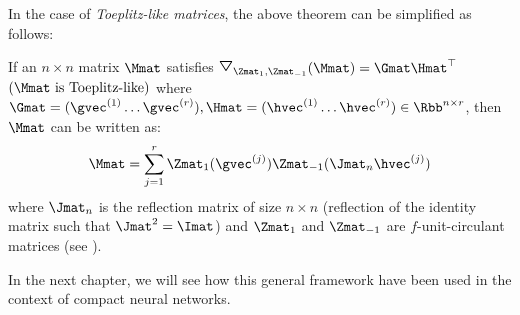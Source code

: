 \noindent
In the case of \emph{Toeplitz-like matrices}, the above theorem can be simplified as follows:
\begin{theorem} \label{theorem:ch2-toeplitz_like}
  If an $n \times n$ matrix $\Mmat$ satisfies $\triangleopdown_{\Zmat_1, \Zmat_{-1}}(\Mmat) = \Gmat \Hmat^\top$ $(\Mmat \text{ is Toeplitz-like})$ where $\Gmat = (\gvec ^{(1)} \ldots \gvec^{(r)}), \Hmat = (\hvec^{(1)} \ldots \hvec^{(r)}) \in \Rbb^{n \times r}$, then $\Mmat$ can be written as: 
  \begin{equation} \label{equation:ch2-toeplitz_like_matrix_decomposition}
    \Mmat = \sum_{j=1}^{r} \Zmat_1(\gvec^{(j)}) \Zmat_{-1}(\Jmat_n \hvec^{(j)})
  \end{equation}
  where $\Jmat_n$ is the reflection matrix of size $n \times n$ (reflection of the identity matrix such that $\Jmat^2 = \Imat$) and $\Zmat_1$ and $\Zmat_{-1}$ are $f$-unit-circulant matrices (see ).
\end{theorem}
\noindent
In the next chapter, we will see how this general framework have been used in the context of compact neural networks.


